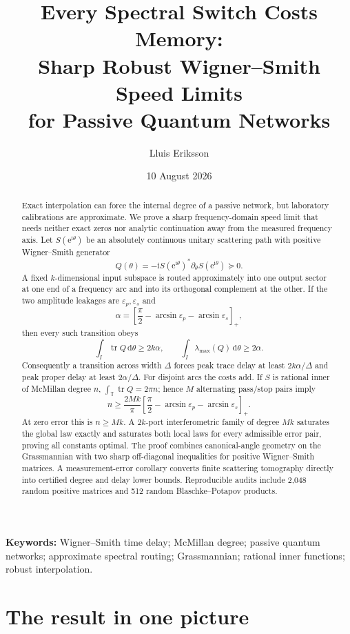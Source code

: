 \documentclass[11pt]{article}
\title{Every Spectral Switch Costs Memory:\\
Sharp Robust Wigner--Smith Speed Limits\\
for Passive Quantum Networks}
\author{Lluis Eriksson}
\date{10 August 2026}
\theoremstyle{definition}
\theoremstyle{remark}
\newcommand{\T}{\mathbb{T}}
\newcommand{\tr}{\operatorname{tr}}
\newcommand{\dd}{\mathrm{d}}
\newcommand{\e}{\mathrm{e}}
\begin{document}
\maketitle

\begin{abstract}
Exact interpolation can force the internal degree of a passive network, but
laboratory calibrations are approximate.  We prove a sharp frequency-domain
speed limit that needs neither exact zeros nor analytic continuation away
from the measured frequency axis.  Let $S(\e^{\mathrm{i}\theta})$ be an
absolutely continuous unitary scattering path with positive Wigner--Smith
generator
\[
 Q(\theta)=-\mathrm{i}S(\e^{\mathrm{i}\theta})^*
 \partial_\theta S(\e^{\mathrm{i}\theta})\succeq0.
\]
A fixed $k$-dimensional input subspace is routed approximately into one
output sector at one end of a frequency arc and into its orthogonal
complement at the other.  If the two amplitude leakages are
$\varepsilon_p,\varepsilon_s$ and
\[
 \alpha=\left[\frac{\pi}{2}-\arcsin\varepsilon_p
                      -\arcsin\varepsilon_s\right]_+,
\]
then every such transition obeys
\[
 \int_I\tr Q\,\dd\theta\geq2k\alpha,
 \qquad
 \int_I\lambda_{\max}(Q)\,\dd\theta\geq2\alpha.
\]
Consequently a transition across width $\Delta$ forces peak trace delay at
least $2k\alpha/\Delta$ and peak proper delay at least
$2\alpha/\Delta$.  For disjoint arcs the costs add.  If $S$ is rational
inner of McMillan degree $n$, $\int_\T\tr Q=2\pi n$; hence $M$
alternating pass/stop pairs imply
\[
 \boxed{\displaystyle
 n\geq \frac{2Mk}{\pi}
 \left[\frac{\pi}{2}-\arcsin\varepsilon_p
                      -\arcsin\varepsilon_s\right]_+.}
\]
At zero error this is $n\geq Mk$.  A $2k$-port interferometric family of
degree $Mk$ saturates the global law exactly and saturates both local laws
for every admissible error pair, proving all constants optimal.  The proof
combines canonical-angle geometry on the Grassmannian with two sharp
off-diagonal inequalities for positive Wigner--Smith matrices.  A
measurement-error corollary converts finite scattering tomography directly
into certified degree and delay lower bounds.  Reproducible audits include
2,048 random positive matrices and 512 random Blaschke--Potapov products.
\end{abstract}

\noindent\textbf{Keywords:} Wigner--Smith time delay; McMillan degree;
passive quantum networks; approximate spectral routing; Grassmannian;
rational inner functions; robust interpolation.

\section{The result in one picture}
\end{document}
